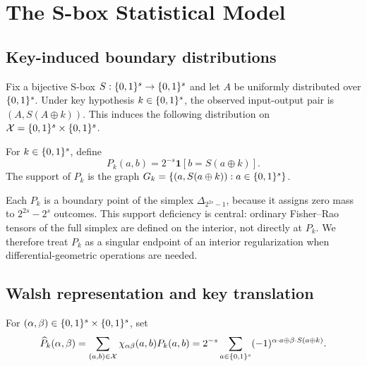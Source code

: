 \section{The S-box Statistical Model}\label{sec:manifold}

\subsection{Key-induced boundary distributions}

Fix a bijective S-box $S:\{0,1\}^{s}\to\{0,1\}^{s}$ and let $A$ be uniformly distributed
over $\{0,1\}^{s}$.  Under key hypothesis $k\in\{0,1\}^{s}$, the observed input-output pair
is $(A,S(A\oplus k))$.  This induces the following distribution on
$\mathcal X=\{0,1\}^{s}\times\{0,1\}^{s}$.

\begin{definition}\label{def:key-dist}
For $k\in\{0,1\}^{s}$, define
\begin{equation}\label{eq:pk}
  P_k(a,b)=2^{-s}\mathbf 1[b=S(a\oplus k)].
\end{equation}
The support of $P_k$ is the graph
$G_k=\{(a,S(a\oplus k)):a\in\{0,1\}^{s}\}$.
\end{definition}

Each $P_k$ is a boundary point of the simplex $\Delta_{2^{2s}-1}$, because it
assigns zero mass to $2^{2s}-2^s$ outcomes.  This support deficiency is central:
ordinary Fisher--Rao tensors of the full simplex are defined on the interior,
not directly at $P_k$.  We therefore treat $P_k$ as a singular endpoint of an
interior regularization when differential-geometric operations are needed.

\subsection{Walsh representation and key translation}

\begin{definition}\label{def:wht-pk}
For $(\alpha,\beta)\in\{0,1\}^{s}\times\{0,1\}^{s}$, set
\begin{equation}\label{eq:wht-pk}
  \widehat P_k(\alpha,\beta)
  =\sum_{(a,b)\in\mathcal X}\chi_{\alpha\beta}(a,b)P_k(a,b)
  =2^{-s}\sum_{a\in\{0,1\}^{s}}(-1)^{\alpha\cdot a\oplus\beta\cdot S(a\oplus k)}.
\end{equation}
\end{definition}

